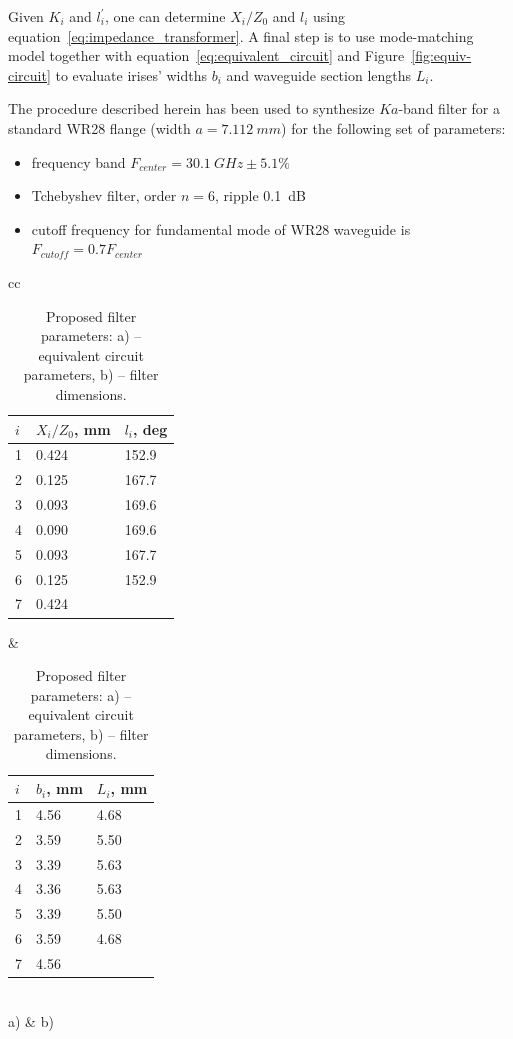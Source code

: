 \documentclass{pj}
\begin{document}
Given $K_i$ and $l^{\prime}_i$, one can determine $X_i/Z_0$ and
$l_i$ using equation~\eqref{eq:impedance_transformer}. A final step
is to use mode-matching model together with
equation~\eqref{eq:equivalent_circuit} and
Figure~\ref{fig:equiv-circuit} to evaluate irises' widths
$b_i$ and waveguide section lengths $L_i$.

The procedure described herein has been used to synthesize $Ka$-band
filter for a standard WR28 flange (width $a = 7.112~mm$) for the
following set of parameters:
\begin{itemize}
\item frequency band $F_{center} = 30.1~GHz \pm 5.1\%$
\item Tchebyshev filter, order $n = 6$, ripple 0.1~dB
\item cutoff frequency for fundamental mode of WR28 waveguide is $F_{cutoff} = 0.7 F_{center}$
\end{itemize}

\begin{table}

  \begin{tabular}{cc}
  \begin{tabular}{|l|l|l|}
    \hline
    $i$ & $X_i/Z_0$, mm & $l_i$, deg \\ \hline
    1 & 0.424 & 152.9 \\ \hline
    2 & 0.125 & 167.7 \\ \hline
    3 & 0.093 & 169.6 \\ \hline
    4 & 0.090 & 169.6 \\ \hline
    5 & 0.093 & 167.7 \\ \hline
    6 & 0.125 & 152.9 \\ \hline
    7 & 0.424 & \\ \hline
  \end{tabular} &
  \begin{tabular}{|l|l|l|}
    \hline
    $i$ & $b_i$, mm & $L_i$, mm \\ \hline
    1 & 4.56 & 4.68 \\ \hline
    2 & 3.59 & 5.50 \\ \hline
    3 & 3.39 & 5.63 \\ \hline
    4 & 3.36 & 5.63 \\ \hline
    5 & 3.39 & 5.50 \\ \hline
    6 & 3.59 & 4.68 \\ \hline
    7 & 4.56 & \\ \hline
  \end{tabular} \\
    a) & b) 
  \end{tabular}
  \caption{Proposed filter parameters: a) -- equivalent circuit
    parameters, b) -- filter dimensions.}
  \label{tab:filter_dimensions}
\end{table}
\end{document}
